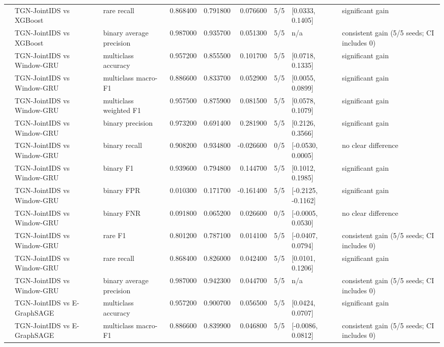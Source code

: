 \begin{table}
\begin{tabular}{lllrrrlll}
 & TGN-JointIDS vs XGBoost & rare recall & 0.868400 & 0.791800 & 0.076600 & 5/5 & [0.0333, 0.1405] & significant gain \\
 & TGN-JointIDS vs XGBoost & binary average precision & 0.987000 & 0.935700 & 0.051300 & 5/5 & n/a & consistent gain (5/5 seeds; CI includes 0) \\
 & TGN-JointIDS vs Window-GRU & multiclass accuracy & 0.957200 & 0.855500 & 0.101700 & 5/5 & [0.0718, 0.1335] & significant gain \\
 & TGN-JointIDS vs Window-GRU & multiclass macro-F1 & 0.886600 & 0.833700 & 0.052900 & 5/5 & [0.0055, 0.0899] & significant gain \\
 & TGN-JointIDS vs Window-GRU & multiclass weighted F1 & 0.957500 & 0.875900 & 0.081500 & 5/5 & [0.0578, 0.1079] & significant gain \\
 & TGN-JointIDS vs Window-GRU & binary precision & 0.973200 & 0.691400 & 0.281900 & 5/5 & [0.2126, 0.3566] & significant gain \\
 & TGN-JointIDS vs Window-GRU & binary recall & 0.908200 & 0.934800 & -0.026600 & 0/5 & [-0.0530, 0.0005] & no clear difference \\
 & TGN-JointIDS vs Window-GRU & binary F1 & 0.939600 & 0.794800 & 0.144700 & 5/5 & [0.1012, 0.1985] & significant gain \\
 & TGN-JointIDS vs Window-GRU & binary FPR & 0.010300 & 0.171700 & -0.161400 & 5/5 & [-0.2125, -0.1162] & significant gain \\
 & TGN-JointIDS vs Window-GRU & binary FNR & 0.091800 & 0.065200 & 0.026600 & 0/5 & [-0.0005, 0.0530] & no clear difference \\
 & TGN-JointIDS vs Window-GRU & rare F1 & 0.801200 & 0.787100 & 0.014100 & 5/5 & [-0.0407, 0.0794] & consistent gain (5/5 seeds; CI includes 0) \\
 & TGN-JointIDS vs Window-GRU & rare recall & 0.868400 & 0.826000 & 0.042400 & 5/5 & [0.0101, 0.1206] & significant gain \\
 & TGN-JointIDS vs Window-GRU & binary average precision & 0.987000 & 0.942300 & 0.044700 & 5/5 & n/a & consistent gain (5/5 seeds; CI includes 0) \\
 & TGN-JointIDS vs E-GraphSAGE & multiclass accuracy & 0.957200 & 0.900700 & 0.056500 & 5/5 & [0.0424, 0.0707] & significant gain \\
 & TGN-JointIDS vs E-GraphSAGE & multiclass macro-F1 & 0.886600 & 0.839900 & 0.046800 & 5/5 & [-0.0086, 0.0812] & consistent gain (5/5 seeds; CI includes 0) \\

\end{tabular}
\end{table}
